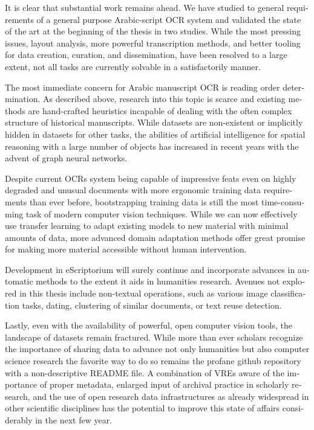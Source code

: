 \begin{french}
It is clear that substantial work remains ahead. We have studied to general
requirements of a general purpose Arabic-script OCR system and validated the
state of the art at the beginning of the thesis in two studies. While the most
pressing issues, layout analysis, more powerful transcription methods, and
better tooling for data creation, curation, and dissemination, have been
resolved to a large extent, not all tasks are currently solvable in a
satisfactorily manner.

The most immediate concern for Arabic manuscript OCR is reading order
determination. As described above, research into this topic is scarce and
existing methods are hand-crafted heuristics incapable of dealing with the
often complex structure of historical manuscripts. While datasets are
non-existent or implicitly hidden in datasets for other tasks, the abilities of
artificial intelligence for spatial reasoning with a large number of objects
has increased in recent years with the advent of graph neural networks.

Despite current OCRs system being capable of impressive feats even on highly
degraded and unusual documents with more ergonomic training data requirements
than ever before, bootstrapping training data is still the most time-consuming
task of modern computer vision techniques. While we can now effectively use
transfer learning to adapt existing models to new material with minimal amounts
of data, more advanced domain adaptation methods offer great promise for making
more material accessible without human intervention.

Development in eScriptorium will surely continue and incorporate advances in
automatic methods to the extent it aids in humanities research. Avenues not
explored in this thesis include non-textual operations, such as  various image
classification tasks, dating, clustering of similar documents, or text reuse
detection.

Lastly, even with the availability of powerful, open computer vision tools, the
landscape of datasets remain fractured. While more than ever scholars recognize
the importance of sharing data to advance not only humanities but also computer
science research the favorite way to do so remains the profane github
repository with a non-descriptive README file. A combination of VREs aware of
the importance of proper metadata, enlarged input of archival practice in
scholarly research, and the use of open research data infrastructures as
already widespread in other scientific disciplines has the potential to improve
this state of affairs considerably in the next few year.

\end{french}

